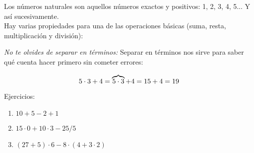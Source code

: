 Los números naturales son aquellos números exactos y positivos: 1, 2, 3, 4, 5... Y así sucesivamente. \\ Hay varias propiedades para una de las operaciones básicas (suma, resta, multiplicación y división):
\textit{No te olvides de separar en términos:} Separar en términos nos sirve para saber qué cuenta hacer primero sin cometer errores:

\begin{equation}
    \notag
    5\cdot3+4 = \overbrace{5\cdot3} + 4 = 15+4=19 
\end{equation}



\raggedright
Ejercicios:


\begin{enumerate}
\renewcommand{\labelenumi}{{\theenumi})}
\item $10+5-2+1$
\item $15\cdot0+10\cdot3-25/5$
\item $(27+5)\cdot6-8\cdot(4+3\cdot2)$
\end{enumerate}